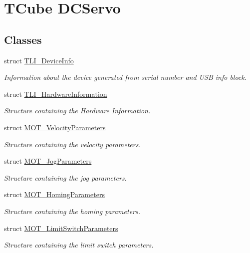 \hypertarget{group___k_cube_motorised_gripper}{}\section{T\+Cube D\+C\+Servo}
\label{group___k_cube_motorised_gripper}
\subsection*{Classes}
\begin{DoxyCompactItemize}
\item 
struct \hyperlink{struct_t_l_i___device_info}{T\+L\+I\+\_\+\+Device\+Info}
\begin{DoxyCompactList}\small\item\em Information about the device generated from serial number and U\+SB info block. \end{DoxyCompactList}\item 
struct \hyperlink{struct_t_l_i___hardware_information}{T\+L\+I\+\_\+\+Hardware\+Information}
\begin{DoxyCompactList}\small\item\em Structure containing the Hardware Information. \end{DoxyCompactList}\item 
struct \hyperlink{struct_m_o_t___velocity_parameters}{M\+O\+T\+\_\+\+Velocity\+Parameters}
\begin{DoxyCompactList}\small\item\em Structure containing the velocity parameters. \end{DoxyCompactList}\item 
struct \hyperlink{struct_m_o_t___jog_parameters}{M\+O\+T\+\_\+\+Jog\+Parameters}
\begin{DoxyCompactList}\small\item\em Structure containing the jog parameters. \end{DoxyCompactList}\item 
struct \hyperlink{struct_m_o_t___homing_parameters}{M\+O\+T\+\_\+\+Homing\+Parameters}
\begin{DoxyCompactList}\small\item\em Structure containing the homing parameters. \end{DoxyCompactList}\item 
struct \hyperlink{struct_m_o_t___limit_switch_parameters}{M\+O\+T\+\_\+\+Limit\+Switch\+Parameters}
\begin{DoxyCompactList}\small\item\em Structure containing the limit switch parameters. \end{DoxyCompactList}\item 

\end{DoxyCompactItemize}
